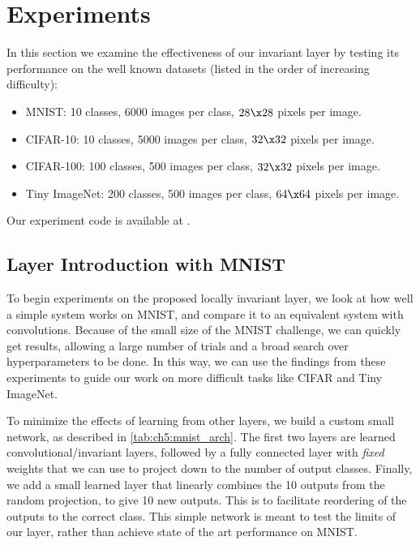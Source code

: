 \section{Experiments}\label{sec:ch5:experiments}
In this section we examine the effectiveness of our invariant layer by testing
its performance on the well known datasets (listed in the order of increasing
difficulty):
\begin{itemize}
  \item MNIST: 10 classes, 6000 images per class, $28\x 28$ pixels per image.
  \item CIFAR-10: 10 classes, 5000 images per class, $32\x 32$ pixels per image.
  \item CIFAR-100: 100 classes, 500 images per class, $32\x 32$ pixels per image. 
  \item Tiny ImageNet\cite{li_tiny_2017}: 200 classes, 500 images per class, 
    $64 \x 64$ pixels per image. 
\end{itemize}
Our experiment code is available at \cite{cotter_learnable_2019-1}.

\subsection{Layer Introduction with MNIST}\label{sec:ch5:mnist}



To begin experiments on the proposed locally invariant layer, we look at how
well a simple system works on MNIST, and compare it to an equivalent system with
convolutions. Because of the small size of the MNIST challenge, we can quickly
get results, allowing a large number of trials and a broad search over
hyperparameters to be done. In this way, we can use the findings from these
experiments to guide our work on more difficult tasks like CIFAR and Tiny
ImageNet.

To minimize the effects of learning from other layers, we build a
custom small network, as described in \autoref{tab:ch5:mnist_arch}. 
The first two layers are learned convolutional/invariant layers, followed by
a fully connected layer with \emph{fixed} weights that we can use to project down to
the number of output classes. Finally, we add a small learned layer that
linearly combines the 10 outputs from the random projection, to give 10 new
outputs. This is to facilitate reordering of the outputs to the correct class.
This simple network is meant to test the limits of our layer, rather than
achieve state of the art performance on MNIST.

